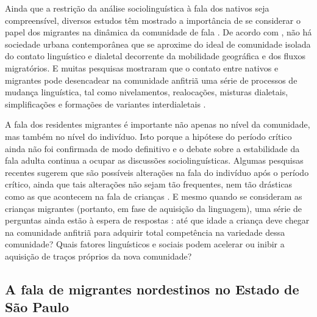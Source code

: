 \documentclass[
	a4paper,	%
	12pt,		%
	]{article}	%
\begin{document}
Ainda que a restrição da análise sociolinguística à fala dos nativos seja
compreensível, diversos estudos têm mostrado a importância de se considerar o
papel dos migrantes na dinâmica da comunidade de fala \citep{Britain2018,
Bortoni-Ricardo2011, Trudgill1986}. De acordo com \citet{Milroy2002}, não há
sociedade urbana contemporânea que se aproxime do ideal de comunidade isolada do
contato linguístico e dialetal decorrente da mobilidade geográfica e dos fluxos
migratórios. E muitas pesquisas mostraram que o contato entre nativos e
migrantes pode desencadear na comunidade anfitriã uma série de processos de
mudança linguística, tal como nivelamentos, realocações, misturas dialetais,
simplificações e formações de variantes interdialetais \citep{Trudgill1986}.

A fala dos residentes migrantes é importante não apenas no nível da
comunidade, mas também no nível do indivíduo. Isto porque a hipótese do
período crítico \citep{Lenneberg1967} ainda não foi confirmada de modo
definitivo e o debate sobre a estabilidade da fala adulta continua a ocupar
as discussões sociolinguísticas. Algumas pesquisas recentes sugerem que são
possíveis alterações na fala do indivíduo após o período crítico, ainda que
tais alterações não sejam tão frequentes, nem tão drásticas como as que
acontecem na fala de crianças \citep{Cukor-Avila.Bailey2013}. E mesmo quando
se consideram as crianças migrantes (portanto, em fase de aquisição da
linguagem), uma série de perguntas ainda estão à espera de respostas
\citep{Oushiro2018, Nycz2015, Chambers1992, Trudgill1986}: até que idade a
criança deve chegar na comunidade anfitriã para adquirir total competência
na variedade dessa comunidade? Quais fatores linguísticos e sociais podem
acelerar ou inibir a aquisição de traços próprios da nova comunidade?

\subsection{A fala de migrantes nordestinos no Estado de São Paulo}
\label{estudos-sp}
\end{document}
